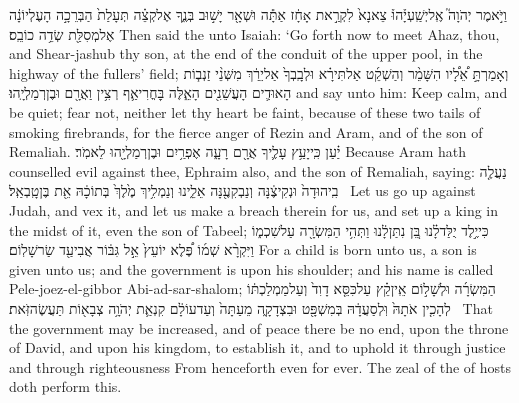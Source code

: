 {וַיֹּ֣אמֶר יְהֹוָה֮ אֶֽל\maqqaf יְשַֽׁעְיָ֒הוּ֒ צֵא\maqqaf נָא֙ לִקְרַ֣את אָחָ֔ז אַתָּ֕ה וּשְׁאָ֖ר יָשׁ֣וּב בְּנֶ֑ךָ אֶל\maqqaf קְצֵ֗ה תְּעָלַת֙ הַבְּרֵכָ֣ה הָעֶלְיוֹנָ֔ה אֶל\maqqaf מְסִלַּ֖ת שְׂדֵ֥ה כוֹבֵֽס׃}
{Then said the \lord\space unto Isaiah: ‘Go forth now to meet Ahaz, thou, and Shear-jashub thy son, at the end of the conduit of the upper pool, in the highway of the fullers’ field;}
{וְאָמַרְתָּ֣ אֵ֠לָ֠יו הִשָּׁמֵ֨ר וְהַשְׁקֵ֜ט אַל\maqqaf תִּירָ֗א וּלְבָֽבְךָ֙ אַל\maqqaf יֵרַ֔ךְ מִשְּׁנֵ֨י זַנְב֧וֹת הָאוּדִ֛ים הָעֲשֵׁנִ֖ים הָאֵ֑לֶּה בׇּחֳרִי\maqqaf אַ֛ף רְצִ֥ין וַאֲרָ֖ם וּבֶן\maqqaf רְמַלְיָֽהוּ׃}
{and say unto him: Keep calm, and be quiet; fear not, neither let thy heart be faint, because of these two tails of smoking firebrands, for the fierce anger of Rezin and Aram, and of the son of Remaliah.}
{יַ֗עַן כִּֽי\maqqaf יָעַ֥ץ עָלֶ֛יךָ אֲרָ֖ם רָעָ֑ה אֶפְרַ֥יִם וּבֶן\maqqaf רְמַלְיָ֖הוּ לֵאמֹֽר׃}
{Because Aram hath counselled evil against thee, Ephraim also, and the son of Remaliah, saying:}
{נַעֲלֶ֤ה בִֽיהוּדָה֙ וּנְקִיצֶ֔נָּה וְנַבְקִעֶ֖נָּה אֵלֵ֑ינוּ וְנַמְלִ֥יךְ מֶ֙לֶךְ֙ בְּתוֹכָ֔הּ אֵ֖ת בֶּן\maqqaf טָֽבְאַֽל׃ \petucha }
{Let us go up against Judah, and vex it, and let us make a breach therein for us, and set up a king in the midst of it, even the son of Tabeel;}
\newperek
\setcounter{chap}{9}
\setcounter{verse}{5}
{כִּי\maqqaf יֶ֣לֶד יֻלַּד\maqqaf לָ֗נוּ בֵּ֚ן נִתַּן\maqqaf לָ֔נוּ וַתְּהִ֥י הַמִּשְׂרָ֖ה עַל\maqqaf שִׁכְמ֑וֹ וַיִּקְרָ֨א שְׁמ֜וֹ פֶּ֠לֶא יוֹעֵץ֙ אֵ֣ל גִּבּ֔וֹר אֲבִי\maqqaf עַ֖ד שַׂר\maqqaf שָׁלֽוֹם׃}
{For a child is born unto us, a son is given unto us; and the government is upon his shoulder; and his name is called Pele-joez-el-gibbor Abi-ad-sar-shalom;}
{ הַמִּשְׂרָ֜ה וּלְשָׁל֣וֹם אֵֽין\maqqaf קֵ֗ץ עַל\maqqaf כִּסֵּ֤א דָוִד֙ וְעַל\maqqaf מַמְלַכְתּ֔וֹ לְהָכִ֤ין אֹתָהּ֙ וּֽלְסַעֲדָ֔הּ בְּמִשְׁפָּ֖ט וּבִצְדָקָ֑ה מֵעַתָּה֙ וְעַד\maqqaf עוֹלָ֔ם קִנְאַ֛ת יְהֹוָ֥ה צְבָא֖וֹת תַּעֲשֶׂה\maqqaf זֹּֽאת׃ \petucha }
{That the government may be increased, and of peace there be no end, upon the throne of David, and upon his kingdom, to establish it, and to uphold it through justice and through righteousness From henceforth even for ever. The zeal of the \lord\space of hosts doth perform this.}
\label{haft_18}
